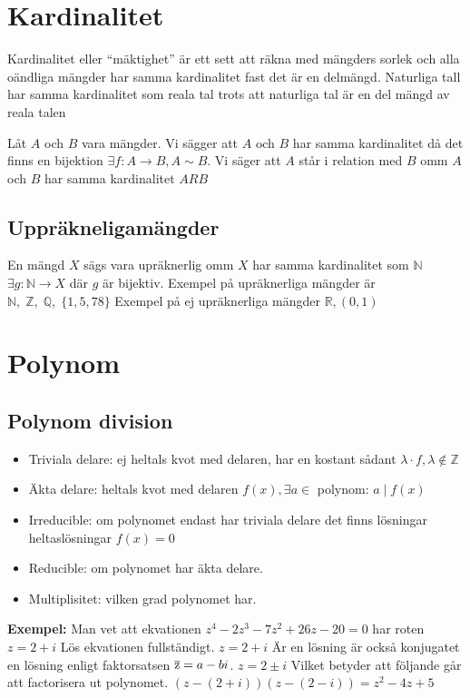 \begin{multicols}{2}
\section{Kardinalitet}
Kardinalitet eller ``mäktighet'' är ett sett att räkna med mängders sorlek och alla
oändliga mängder har samma kardinalitet fast det är en delmängd. Naturliga tall har samma
kardinalitet som reala tal trots att naturliga tal är en del mängd av reala talen

Låt $A$ och $B$ vara mängder. Vi sägger att $A$ och $B$ har samma kardinalitet då det finns en bijektion
$\exists f: A \to B, A \sim B$. Vi säger att $A$ står i relation med $B$ omm $A$ och $B$ har samma kardinalitet $ARB$

\subsection{Uppräkneligamängder}
En mängd $X$ sägs vara upräknerlig omm $X$ har samma kardinalitet som $\mathbb{N}$
$\exists g: \mathbb{N} \to X$ där $g$ är bijektiv.
Exempel på upräknerliga mängder är $\mathbb{N},\; \mathbb{Z},\; \mathbb{Q},\; \{ 1,5,78 \}$
Exempel på ej upräknerliga mängder $\mathbb{R}, (0,1)$


\section{Polynom}
\subsection{Polynom division}
\begin{itemize}
  \item Triviala delare: ej heltals kvot med delaren, har en kostant sådant $\lambda \cdot f, \lambda \notin \mathbb{Z}$
  \item Äkta delare: heltals kvot med delaren $f(x), \exists a \in$ polynom: $a \mid f(x)$
  \item Irreducible: om polynomet endast har triviala delare det finns lösningar heltaslösningar $f(x)=0$
  \item Reducible: om polynomet har äkta delare.
  \item Multiplisitet: vilken grad polynomet har.
\end{itemize}


\textbf{Exempel:}
Man vet att ekvationen $z^4 - 2z^3 - 7z^2 + 26z - 20 = 0$ har roten $z = 2 + i$ Lös ekvationen fullständigt.
$z = 2 + i$ Är en lösning är också konjugatet en lösning enligt faktorsatsen $\overline{\rm z}= a - b i$.
$z = 2 \pm i$ Vilket betyder att följande går att factorisera ut polynomet.
$(z -(2 + i))(z -(2 - i)) = z^2 - 4z + 5$


\end{multicols}
